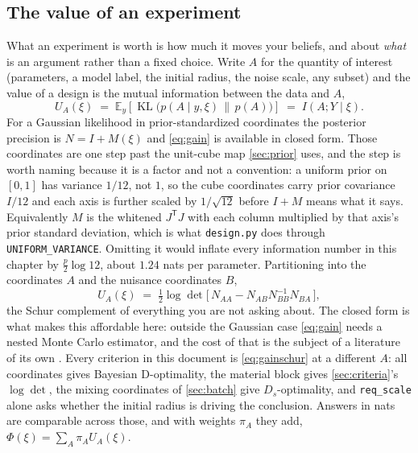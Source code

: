 \documentclass[10pt]{article}
\begin{document}
\subsection*{The value of an experiment}

What an experiment is worth is how much it moves your beliefs, and about \emph{what} is an
argument rather than a fixed choice. Write $A$ for the quantity of interest (parameters,
a model label, the initial radius, the noise scale, any subset) and the value of a design
is the mutual information between the data and $A$,
%
\begin{equation}
U_A(\xi) \;=\; \mathbb{E}_y\!\left[\operatorname{KL}\!\big(p(A \mid y,\xi)\,\|\,p(A)\big)\right]
\;=\; I(A;Y \mid \xi) .
\label{eq:gain}
\end{equation}
%
For a Gaussian likelihood in prior-standardized coordinates the posterior precision is
$N = I + M(\xi)$ and \eqref{eq:gain} is available in closed form. Those coordinates are one
step past the unit-cube map \cref{sec:prior} uses, and the step is worth naming because it is a
factor and not a convention: a uniform prior on $[0,1]$ has variance $1/12$, not $1$, so the
cube coordinates carry prior covariance $I/12$ and each axis is further scaled by
$1/\sqrt{12}$ before $I + M$ means what it says. Equivalently $M$ is the whitened
$J^{\mathsf T}J$ with each column multiplied by that axis's prior standard deviation, which is
what \texttt{design.py} does through \texttt{UNIFORM\_VARIANCE}. Omitting it would inflate every
information number in this chapter by $\tfrac{p}{2}\log 12$, about $1.24$ nats per parameter. Partitioning
into the coordinates $A$ and the nuisance coordinates $B$,
%
\begin{equation}
U_A(\xi) \;=\; \tfrac12 \log\det\Big[\,N_{AA} - N_{AB}N_{BB}^{-1}N_{BA}\,\Big],
\label{eq:gainschur}
\end{equation}
%
the Schur complement of everything you are not asking about. The closed form is what makes
this affordable here: outside the Gaussian case \eqref{eq:gain} needs a nested Monte Carlo
estimator, and the cost of that is the subject of a literature of its own
\citep{long2013fast,beck2018fast,foster2019variational,huan2024optimal}. Every criterion in this document
is \eqref{eq:gainschur} at a different $A$: all coordinates gives Bayesian D-optimality, the
material block gives \cref{sec:criteria}'s $\log\det$, the mixing coordinates of
\cref{sec:batch} give $D_s$-optimality, and \texttt{req\_scale} alone asks whether the initial
radius is driving the conclusion. Answers in nats are comparable across those, and with
weights $\pi_A$ they add, $\Phi(\xi) = \sum_A \pi_A U_A(\xi)$.
\end{document}
